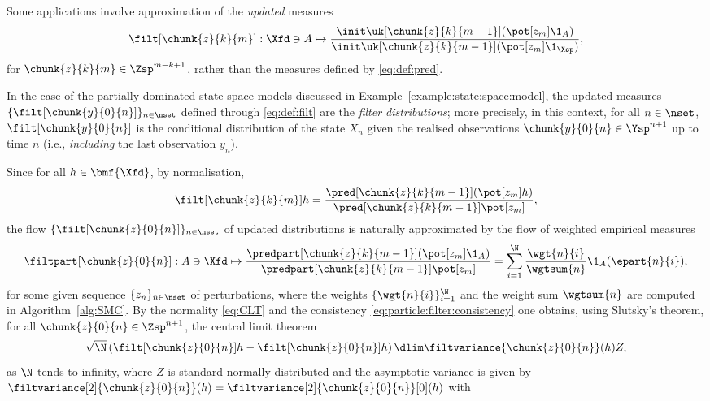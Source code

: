 Some applications involve approximation of the \emph{updated} measures 
\begin{equation} \label{eq:def:filt}
    \filt[\chunk{z}{k}{m}] : \Xfd \ni A 
    \mapsto \frac{\init \uk[\chunk{z}{k}{m - 1}] (\pot[z_m] \1_A)}
    {\init \uk[\chunk{z}{k}{m - 1}] (\pot[z_m] \1_\Xsp)},
\end{equation}
for $\chunk{z}{k}{m} \in \Zsp^{m - k + 1}$, rather than the measures defined by \eqref{eq:def:pred}.   
\begin{example}
In the case of the partially dominated state-space models discussed in Example~\ref{example:state:space:model}, the updated measures $\{ \filt[\chunk{y}{0}{n}] \}_{n \in \nset}$ defined through \eqref{eq:def:filt} are the \emph{filter distributions}; more precisely, in this context, for all $n \in \nset$, $\filt[\chunk{y}{0}{n}]$ is the conditional distribution of the state $X_n$ given the realised observations $\chunk{y}{0}{n} \in \Ysp^{n + 1}$ up to time $n$ (i.e., \emph{including} the last observation $y_n$). 
\end{example}
Since for all $h \in \bmf{\Xfd}$, by normalisation, 
$$
    \filt[\chunk{z}{k}{m}] h = \frac{\pred[\chunk{z}{k}{m - 1}](\pot[z_m] h)}{\pred[\chunk{z}{k}{m - 1}] \pot[z_m]},
$$
the flow $\{ \filt[\chunk{z}{0}{n}] \}_{n \in \nset}$ of updated distributions is naturally approximated by the flow of weighted empirical measures 
\begin{equation} \label{eq:def:particle:filter}
    \filtpart[\chunk{z}{0}{n}] : A \ni \Xfd \mapsto \frac{\predpart[\chunk{z}{k}{m - 1}](\pot[z_m] \1_A)}{\predpart[\chunk{z}{k}{m - 1}] \pot[z_m]} = \sum_{i = 1}^\N \frac{\wgt{n}{i}}{\wgtsum{n}} \1_A(\epart{n}{i}),
\end{equation}
for some given sequence $\{ z_n \}_{n \in \nset}$ of perturbations, where the weights $\{ \wgt{n}{i} \}_{i = 1}^\N$ and the weight sum $\wgtsum{n}$ are computed in Algorithm~\ref{alg:SMC}. By the normality \eqref{eq:CLT} and the consistency \eqref{eq:particle:filter:consistency} one obtains, using Slutsky's theorem, for all $\chunk{z}{0}{n} \in \Zsp^{n + 1}$, the central limit theorem 
\begin{equation} \label{eq:CLT:updated:measures}
    \sqrt{\N} \left( \filt[\chunk{z}{0}{n}] h - \filt[\chunk{z}{0}{n}] h \right) \dlim \filtvariance{\chunk{z}{0}{n}}(h) Z,  
\end{equation}
as $\N$ tends to infinity, where $Z$ is standard normally distributed and the asymptotic variance is given by $\filtvariance[2]{\chunk{z}{0}{n}}(h) = \filtvariance[2]{\chunk{z}{0}{n}}[0](h)$ with 
